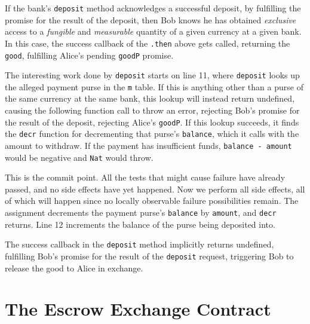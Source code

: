 \documentclass{llncs}
\begin{document}
If the bank's {\tt deposit} method acknowledges a successful deposit, by fulfilling the promise for the result of the deposit, then Bob knows he has obtained \emph{exclusive} access to a \emph{fungible} and \emph{measurable} quantity of a given currency at a given bank. In this case, the success callback of the {\tt .then} above gets called, returning the {\tt good}, fulfilling Alice's pending {\tt goodP} promise.

The interesting work done by {\tt deposit} starts on line 11, where {\tt deposit} looks up the alleged payment purse in the {\tt m} table. If this is anything other than a purse of the same currency at the same bank, this lookup will instead return undefined, causing the following function call to throw an error, rejecting Bob's promise for the result of the deposit, rejecting Alice's {\tt goodP}. If this lookup succeeds, it finds the {\tt decr} function for decrementing that purse's {\tt balance}, which it calls with the amount to withdraw. If the payment has insufficient funds, {\tt balance - amount} would be negative and {\tt Nat} would throw.

This is the commit point. All the tests that might cause failure have already passed, and no side effects have yet happened. Now we perform all side effects, all of which will happen since no locally observable failure possibilities remain. The assignment decrements the payment purse's {\tt balance} by {\tt amount}, and {\tt decr} returns. Line 12 increments the balance of the purse being deposited into.

The success callback in the {\tt deposit} method implicitly returns undefined, fulfilling Bob's promise for the result of the {\tt deposit} request, triggering Bob to release the good to Alice in exchange.



\section{The Escrow Exchange Contract}
\label{exchange}
\end{document}
